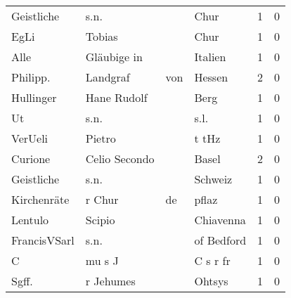 \begin{tabular}{llllrr}
               Geistliche &                               s.n. &             &                                        Chur &          1 &         0 \\
                     EgLi &                             Tobias &             &                                        Chur &          1 &         0 \\
                     Alle &                        Gläubige in &             &                                     Italien &          1 &         0 \\
                 Philipp. &                           Landgraf &         von &                                      Hessen &          2 &         0 \\
                Hullinger &                        Hane Rudolf &             &                                        Berg &          1 &         0 \\
                       Ut &                               s.n. &             &                                        s.l. &          1 &         0 \\
                  VerUeli &                             Pietro &             &                                       t tHz &          1 &         0 \\
                  Curione &                      Celio Secondo &             &                                       Basel &          2 &         0 \\
               Geistliche &                               s.n. &             &                                     Schweiz &          1 &         0 \\
              Kirchenräte &                             r Chur &          de &                                       pflaz &          1 &         0 \\
                  Lentulo &                             Scipio &             &                                   Chiavenna &          1 &         0 \\
             FrancisVSarl &                               s.n. &             &                                  of Bedford &          1 &         0 \\
                        C &                             mu s J &             &                                    C s r fr &          1 &         0 \\
                    Sgff. &                          r Jehumes &             &                                      Ohtsys &          1 &         0 \\

\end{tabular}
